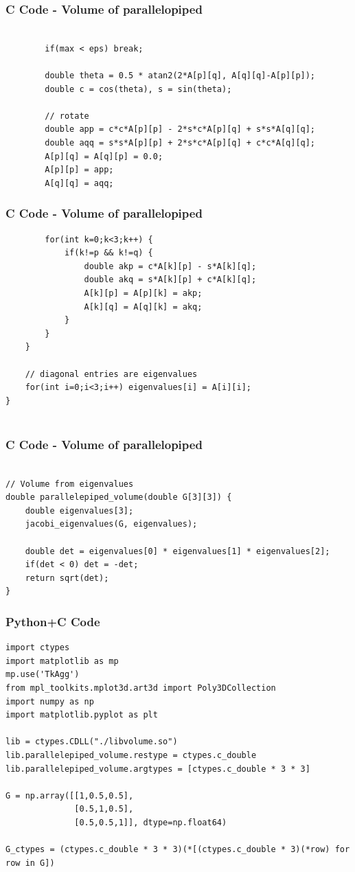 \documentclass{beamer}
\begin{document}
\begin{frame}[fragile]
    \frametitle{C Code - Volume of parallelopiped}

    \begin{lstlisting}

        if(max < eps) break;

        double theta = 0.5 * atan2(2*A[p][q], A[q][q]-A[p][p]);
        double c = cos(theta), s = sin(theta);

        // rotate
        double app = c*c*A[p][p] - 2*s*c*A[p][q] + s*s*A[q][q];
        double aqq = s*s*A[p][p] + 2*s*c*A[p][q] + c*c*A[q][q];
        A[p][q] = A[q][p] = 0.0;
        A[p][p] = app;
        A[q][q] = aqq;

    \end{lstlisting}
\end{frame}
\begin{frame}[fragile]
    \frametitle{C Code - Volume of parallelopiped}

    \begin{lstlisting}
        for(int k=0;k<3;k++) {
            if(k!=p && k!=q) {
                double akp = c*A[k][p] - s*A[k][q];
                double akq = s*A[k][p] + c*A[k][q];
                A[k][p] = A[p][k] = akp;
                A[k][q] = A[q][k] = akq;
            }
        }
    }

    // diagonal entries are eigenvalues
    for(int i=0;i<3;i++) eigenvalues[i] = A[i][i];
}


    \end{lstlisting}
\end{frame}
\begin{frame}[fragile]
    \frametitle{C Code - Volume of parallelopiped}

    \begin{lstlisting}

// Volume from eigenvalues
double parallelepiped_volume(double G[3][3]) {
    double eigenvalues[3];
    jacobi_eigenvalues(G, eigenvalues);

    double det = eigenvalues[0] * eigenvalues[1] * eigenvalues[2];
    if(det < 0) det = -det;
    return sqrt(det);
}

    \end{lstlisting}
\end{frame}



\begin{frame}[fragile]
    \frametitle{Python+C Code}
    \begin{lstlisting}
import ctypes
import matplotlib as mp
mp.use('TkAgg')
from mpl_toolkits.mplot3d.art3d import Poly3DCollection
import numpy as np
import matplotlib.pyplot as plt

lib = ctypes.CDLL("./libvolume.so")
lib.parallelepiped_volume.restype = ctypes.c_double
lib.parallelepiped_volume.argtypes = [ctypes.c_double * 3 * 3]

G = np.array([[1,0.5,0.5],
              [0.5,1,0.5],
              [0.5,0.5,1]], dtype=np.float64)

G_ctypes = (ctypes.c_double * 3 * 3)(*[(ctypes.c_double * 3)(*row) for row in G])
    \end{lstlisting}
\end{frame}
\end{document}
